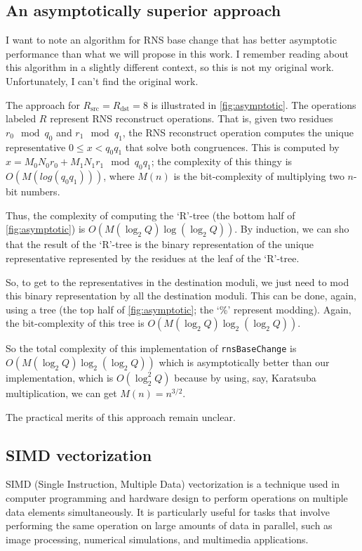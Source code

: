 \subsection{An asymptotically superior approach}
\label{sec:asymptotic}

\figAsymptotic

I want to note an algorithm for RNS base change that has better asymptotic
performance than what we will propose in this work.
I remember reading about this algorithm in a slightly different context, so
this is not my original work.
Unfortunately, I can't find the original work.

The approach for $R_{\textrm{src}} = R_{\textrm{dst}} = 8$ is illustrated in
\autoref{fig:asymptotic}. The operations labeled $R$ represent RNS reconstruct
operations. That is, given two residues $r_0 \mod q_0$ and $r_1 \mod q_1$, the
RNS reconstruct operation computes the unique representative
$0 \leq x < q_0q_1$ that solve both congruences. This is computed by $x =
M_0N_0r_0 + M_1N_1r_1 \mod q_0q_1$; the complexity of this thingy is
$O(M(log(q_0q_1)))$, where $M(n)$ is the bit-complexity of multiplying two
$n$-bit numbers.

Thus, the complexity of computing the `R'-tree (the bottom half of
\autoref{fig:asymptotic}) is $O(M(\log_2Q)\log(\log_2Q))$. By induction, we can
sho that the result of the `R'-tree is the binary representation of the unique
representative represented by the residues at the leaf of the `R'-tree.

So, to get to the representatives in the destination moduli, we just need to
mod this binary representation by all the destination moduli. This can be done,
again, using a tree (the top half of \autoref{fig:asymptotic}; the `\%'
represent modding). Again, the bit-complexity of this tree is
$O(M(\log_2Q)\log_2(\log_2Q))$.

So the total complexity of this implementation of \verb!rnsBaseChange! is
$O(M(\log_2Q)\log_2(\log_2Q))$ which is asymptotically better than our
implementation, which is $O(\log_2^2Q)$ because by using, say, Karatsuba
multiplication, we can get $M(n) = n^{3/2}$.

The practical merits of this approach remain unclear.

\subsection{SIMD vectorization}

SIMD (Single Instruction, Multiple Data) vectorization is a technique used in
computer programming and hardware design to perform operations on multiple data
elements simultaneously. It is particularly useful for tasks that involve
performing the same operation on large amounts of data in parallel, such as
image processing, numerical simulations, and multimedia applications.

